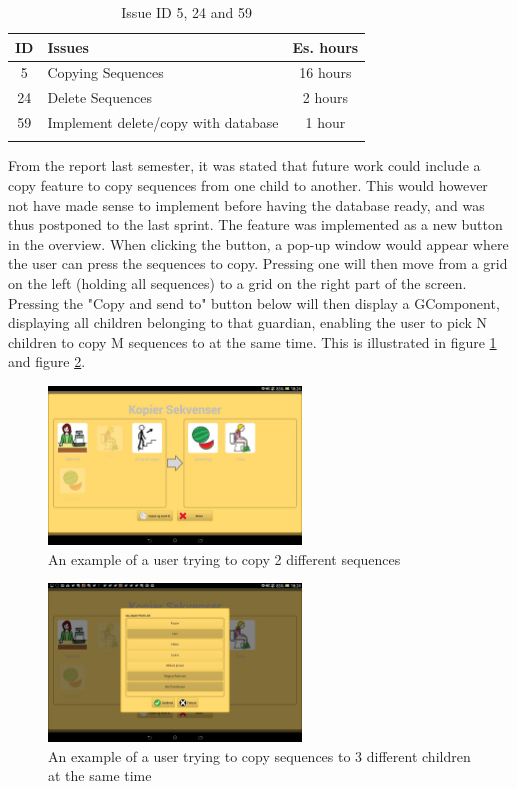\begin{longtable} { | c | p{12cm} | c | } 
\hline
	ID 	&	Issues	&		 Es. hours \\\hline
	5	&	Copying Sequences	&	16 hours	\\\hline
	24	& 	Delete Sequences	&	2 hours \\\hline
	59  	&	Implement delete/copy with database	&	1 hour \\\hline
\caption{Issue ID 5, 24 and 59}
\label{tab:spr4_copyingsequences}
\end{longtable}

From the report last semester, it was stated that future work could include a copy feature to copy sequences from one child to another. This would however not have made sense to implement before having the database ready, and was thus postponed to the last sprint. The feature was implemented as a new button in the overview. When clicking the button, a pop-up window would appear where the user can press the sequences to copy. Pressing one will then move from a grid on the left (holding all sequences) to a grid on the right part of the screen. Pressing the "Copy and send to" button below will then display a GComponent, displaying all children belonging to that guardian, enabling the user to pick N children to copy M sequences to at the same time. This is illustrated in figure \ref{fig:copyDialog} and figure \ref{fig:profilesList}.

\begin{figure} [ht!]
\centering
\includegraphics[width=0.6\textwidth]{Pics/Sprint4/copyPasteDialog/copy}
\caption{An example of a user trying to copy 2 different sequences}
\label{fig:copyDialog}
\end{figure}
\begin{figure} [ht!]
\centering
\includegraphics[width=0.6\textwidth]{Pics/Sprint4/copyPasteDialog/profilelist}
\caption{An example of a user trying to copy sequences to 3 different children at the same time}
\label{fig:profilesList}
\end{figure}

